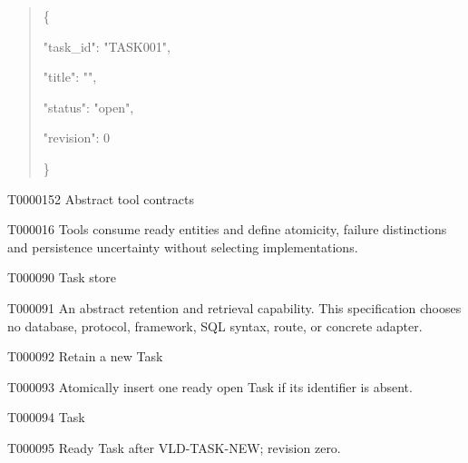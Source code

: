 \documentclass[11pt,a4paper]{article}
\begin{document}
\par\noindent\begin{minipage}{\linewidth}
\begin{quote}\small\ttfamily\raggedright
\noindent \{\par
\noindent   "task\_\allowbreak{}id":\allowbreak{} "TASK001",\par
\noindent   "title":\allowbreak{} "",\par
\noindent   "status":\allowbreak{} "open",\par
\noindent   "revision":\allowbreak{} 0\par
\noindent \}\par
\end{quote}
\end{minipage}\par
{}
\begin{atlasheading}{T000015}{2}
Abstract tool contracts
\end{atlasheading}
\begin{atlasparagraph}{T000016}
Tools consume ready entities and define atomicity, failure distinctions and persistence uncertainty without selecting implementations.
\end{atlasparagraph}
\begin{atlastext}{T000090}
Task store
\end{atlastext}
\begin{atlasparagraph}{T000091}
An abstract retention and retrieval capability. This specification chooses no database, protocol, framework, SQL syntax, route, or concrete adapter.
\end{atlasparagraph}
\begin{atlastext}{T000092}
Retain a new Task
\end{atlastext}
\begin{atlasparagraph}{T000093}
Atomically insert one ready open Task if its identifier is absent.
\end{atlasparagraph}
\begin{atlastext}{T000094}
Task
\end{atlastext}
\begin{atlasparagraph}{T000095}
Ready Task after VLD-TASK-NEW; revision zero.
\end{atlasparagraph}
\end{document}
